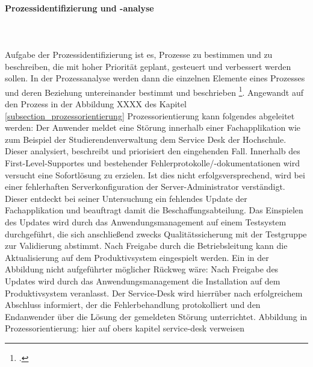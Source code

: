 \paragraph{Prozessidentifizierung und -analyse}\mbox{}\\\\
Aufgabe der Prozessidentifizierung ist es, Prozesse zu bestimmen und zu beschreiben, die mit hoher Priorität geplant, gesteuert und verbessert werden sollen. In der Prozessanalyse werden dann die einzelnen Elemente eines Prozesses und deren Beziehung untereinander bestimmt und beschrieben \footcite{Zitat fehlt}.
Angewandt auf den Prozess in der Abbildung XXXX des Kapitel \ref{subsection_prozessorientierung} Prozessorientierung kann folgendes abgeleitet werden:
Der Anwender meldet eine Störung innerhalb einer Fachapplikation wie zum Beispiel der Studierendenverwaltung dem Service Desk der Hochschule. Dieser analysiert, beschreibt und priorisiert den eingehenden Fall. Innerhalb des First-Level-Supportes und bestehender Fehlerprotokolle/-dokumentationen wird versucht eine Sofortlösung zu erzielen. Ist dies nicht erfolgsversprechend, wird bei einer fehlerhaften Serverkonfiguration der Server-Administrator verständigt. Dieser entdeckt bei seiner Untersuchung ein fehlendes Update der Fachapplikation und beauftragt damit die Beschaffungsabteilung. Das Einspielen des Updates wird durch das Anwendungsmanagement auf einem Testsystem durchgeführt, die sich anschließend zwecks Qualitätssicherung mit der Testgruppe zur Validierung abstimmt. Nach Freigabe durch die Betriebsleitung kann die Aktualisierung auf dem Produktivsystem eingespielt werden.
Ein in der Abbildung nicht aufgeführter möglicher Rückweg wäre: Nach Freigabe des Updates wird durch das Anwendungsmanagement die Installation auf dem Produktivsystem veranlasst. Der Service-Desk wird hierrüber nach erfolgreichem Abschluss informiert, der die Fehlerbehandlung protokolliert und den Endanwender über die Lösung der gemeldeten Störung unterrichtet. 
Abbildung in Prozessorientierung: hier auf obers kapitel service-desk verweisen


